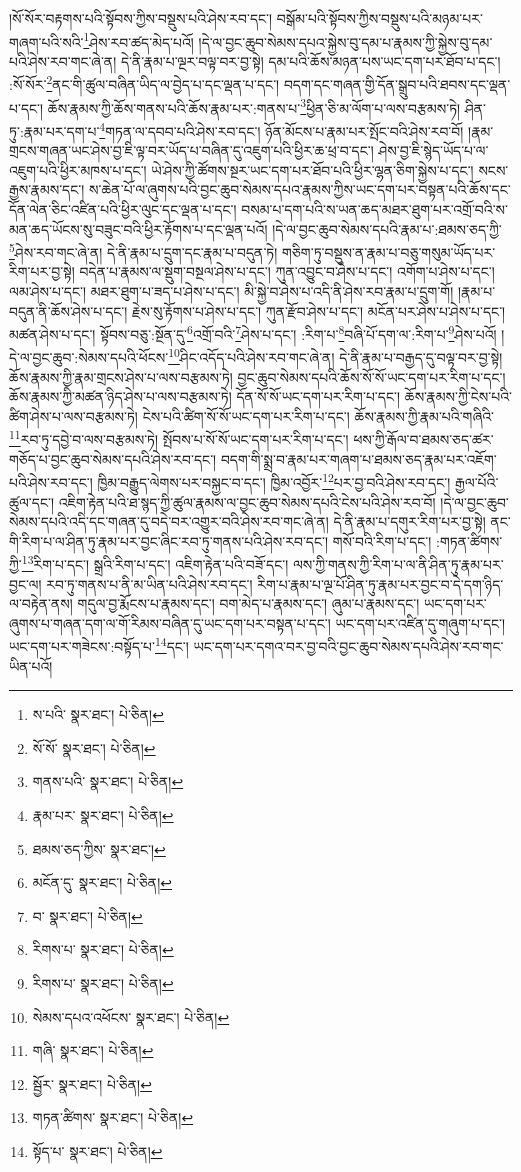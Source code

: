 །སོ་སོར་བརྟགས་པའི་སྟོབས་ཀྱིས་བསྡུས་པའི་ཤེས་རབ་དང་། བསྒོམ་པའི་སྟོབས་ཀྱིས་བསྡུས་པའི་མཉམ་པར་གཞག་པའི་སའི་\footnote{ས་པའི་  སྣར་ཐང་།  པེ་ཅིན། }ཤེས་རབ་ཚད་མེད་པའོ། །དེ་ལ་བྱང་ཆུབ་སེམས་དཔའ་སྐྱེས་བུ་དམ་པ་རྣམས་ཀྱི་སྐྱེས་བུ་དམ་པའི་ཤེས་རབ་གང་ཞེ་ན། དེ་ནི་རྣམ་པ་ལྔར་བལྟ་བར་བྱ་སྟེ། དམ་པའི་ཆོས་མཉན་པས་ཡང་དག་པར་ཐོབ་པ་དང་། :སོ་སོར་\footnote{སོ་སོ་  སྣར་ཐང་།  པེ་ཅིན། }ནང་གི་ཚུལ་བཞིན་ཡིད་ལ་བྱེད་པ་དང་ལྡན་པ་དང་། བདག་དང་གཞན་གྱི་དོན་སྒྲུབ་པའི་ཐབས་དང་ལྡན་པ་དང་། ཆོས་རྣམས་ཀྱི་ཆོས་གནས་པའི་ཆོས་རྣམ་པར་:གནས་པ་\footnote{གནས་པའི་  སྣར་ཐང་།  པེ་ཅིན། }ཕྱིན་ཅི་མ་ལོག་པ་ལས་བརྩམས་ཏེ། ཤིན་ཏུ་:རྣམ་པར་དག་པ་\footnote{རྣམ་པར་  སྣར་ཐང་།  པེ་ཅིན། }གཏན་ལ་དབབ་པའི་ཤེས་རབ་དང་། ཉོན་མོངས་པ་རྣམ་པར་སྤོང་བའི་ཤེས་རབ་བོ། །རྣམ་གྲངས་གཞན་ཡང་ཤེས་བྱ་ཇི་ལྟ་བར་ཡོད་པ་བཞིན་དུ་འཇུག་པའི་ཕྱིར་ཆ་ཕྲ་བ་དང་། ཤེས་བྱ་ཇི་སྙེད་ཡོད་པ་ལ་འཇུག་པའི་ཕྱིར་མཁས་པ་དང་། ཡེ་ཤེས་ཀྱི་ཚོགས་སྔར་ཡང་དག་པར་ཐོབ་པའི་ཕྱིར་ལྷན་ཅིག་སྐྱེས་པ་དང་། སངས་རྒྱས་རྣམས་དང་། ས་ཆེན་པོ་ལ་ཞུགས་པའི་བྱང་ཆུབ་སེམས་དཔའ་རྣམས་ཀྱིས་ཡང་དག་པར་བསྟན་པའི་ཆོས་དང་དོན་ལེན་ཅིང་འཛིན་པའི་ཕྱིར་ལུང་དང་ལྡན་པ་དང་། བསམ་པ་དག་པའི་ས་ཡན་ཆད་མཐར་ཐུག་པར་འགྲོ་བའི་ས་མན་ཆད་ཡོངས་སུ་བཟུང་བའི་ཕྱིར་རྟོགས་པ་དང་ལྡན་པའོ། །དེ་ལ་བྱང་ཆུབ་སེམས་དཔའི་རྣམ་པ་:ཐམས་ཅད་ཀྱི་\footnote{ཐམས་ཅད་ཀྱིས་  སྣར་ཐང་། }ཤེས་རབ་གང་ཞེ་ན། དེ་ནི་རྣམ་པ་དྲུག་དང་རྣམ་པ་བདུན་ཏེ། གཅིག་ཏུ་བསྡུས་ན་རྣམ་པ་བཅུ་གསུམ་ཡོད་པར་རིག་པར་བྱ་སྟེ། བདེན་པ་རྣམས་ལ་སྡུག་བསྔལ་ཤེས་པ་དང་། ཀུན་འབྱུང་བ་ཤེས་པ་དང་། འགོག་པ་ཤེས་པ་དང་། ལམ་ཤེས་པ་དང་། མཐར་ཐུག་པ་ཟད་པ་ཤེས་པ་དང་། མི་སྐྱེ་བ་ཤེས་པ་འདི་ནི་ཤེས་རབ་རྣམ་པ་དྲུག་གོ། །རྣམ་པ་བདུན་ནི་ཆོས་ཤེས་པ་དང་། རྗེས་སུ་རྟོགས་པ་ཤེས་པ་དང་། ཀུན་རྫོབ་ཤེས་པ་དང་། མངོན་པར་ཤེས་པ་ཤེས་པ་དང་། མཚན་ཤེས་པ་དང་། སྟོབས་བཅུ་:སྔོན་དུ་\footnote{མངོན་དུ་  སྣར་ཐང་།  པེ་ཅིན། }འགྲོ་བའི་\footnote{བ་  སྣར་ཐང་།  པེ་ཅིན། }ཤེས་པ་དང་། :རིག་པ་\footnote{རིགས་པ་  སྣར་ཐང་།  པེ་ཅིན། }བཞི་པོ་དག་ལ་:རིག་པ་\footnote{རིགས་པ་  སྣར་ཐང་།  པེ་ཅིན། }ཤེས་པའོ། །དེ་ལ་བྱང་ཆུབ་:སེམས་དཔའི་ཕོངས་\footnote{སེམས་དཔའ་འཕོངས་  སྣར་ཐང་།  པེ་ཅིན། }ཤིང་འདོད་པའི་ཤེས་རབ་གང་ཞེ་ན། དེ་ནི་རྣམ་པ་བརྒྱད་དུ་བལྟ་བར་བྱ་སྟེ། ཆོས་རྣམས་ཀྱི་རྣམ་གྲངས་ཤེས་པ་ལས་བརྩམས་ཏེ། བྱང་ཆུབ་སེམས་དཔའི་ཆོས་སོ་སོ་ཡང་དག་པར་རིག་པ་དང་། ཆོས་རྣམས་ཀྱི་མཚན་ཉིད་ཤེས་པ་ལས་བརྩམས་ཏེ། དོན་སོ་སོ་ཡང་དག་པར་རིག་པ་དང་། ཆོས་རྣམས་ཀྱི་ངེས་པའི་ཚིག་ཤེས་པ་ལས་བརྩམས་ཏེ། ངེས་པའི་ཚིག་སོ་སོ་ཡང་དག་པར་རིག་པ་དང་། ཆོས་རྣམས་ཀྱི་རྣམ་པའི་གཞིའི་\footnote{གཞི་  སྣར་ཐང་།  པེ་ཅིན། }རབ་ཏུ་དབྱེ་བ་ལས་བརྩམས་ཏེ། སྤོབས་པ་སོ་སོ་ཡང་དག་པར་རིག་པ་དང་། ཕས་ཀྱི་རྒོལ་བ་ཐམས་ཅད་ཚར་གཅོད་པ་བྱང་ཆུབ་སེམས་དཔའི་ཤེས་རབ་དང་། བདག་གི་སྨྲ་བ་རྣམ་པར་གཞག་པ་ཐམས་ཅད་རྣམ་པར་འཇོག་པའི་ཤེས་རབ་དང་། ཁྱིམ་བརྒྱུད་ལེགས་པར་བསྐྱང་བ་དང་། ཁྱིམ་འབྱོར་\footnote{སྦྱོར་  སྣར་ཐང་།  པེ་ཅིན། }པར་བྱ་བའི་ཤེས་རབ་དང་། རྒྱལ་པོའི་ཚུལ་དང་། འཇིག་རྟེན་པའི་ཐ་སྙད་ཀྱི་ཚུལ་རྣམས་ལ་བྱང་ཆུབ་སེམས་དཔའི་ངེས་པའི་ཤེས་རབ་བོ། །དེ་ལ་བྱང་ཆུབ་སེམས་དཔའི་འདི་དང་གཞན་དུ་བདེ་བར་འགྱུར་བའི་ཤེས་རབ་གང་ཞེ་ན། དེ་ནི་རྣམ་པ་དགུར་རིག་པར་བྱ་སྟེ། ནང་གི་རིག་པ་ལ་ཤིན་ཏུ་རྣམ་པར་བྱང་ཞིང་རབ་ཏུ་གནས་པའི་ཤེས་རབ་དང་། གསོ་བའི་རིག་པ་དང་། :གཏན་ཚིགས་ཀྱི་\footnote{གཏན་ཚིགས་  སྣར་ཐང་།  པེ་ཅིན། }རིག་པ་དང་། སྒྲའི་རིག་པ་དང་། འཇིག་རྟེན་པའི་བཟོ་དང་། ལས་ཀྱི་གནས་ཀྱི་རིག་པ་ལ་ནི་ཤིན་ཏུ་རྣམ་པར་བྱང་ལ། རབ་ཏུ་གནས་པ་ནི་མ་ཡིན་པའི་ཤེས་རབ་དང་། རིག་པ་རྣམ་པ་ལྔ་པོ་ཤིན་ཏུ་རྣམ་པར་བྱང་བ་དེ་དག་ཉིད་ལ་བརྟེན་ནས། གདུལ་བྱ་རྨོངས་པ་རྣམས་དང་། བག་མེད་པ་རྣམས་དང་། ཞུམ་པ་རྣམས་དང་། ཡང་དག་པར་ཞུགས་པ་གཞན་དག་ལ་གོ་རིམས་བཞིན་དུ་ཡང་དག་པར་བསྟན་པ་དང་། ཡང་དག་པར་འཛིན་དུ་གཞུག་པ་དང་། ཡང་དག་པར་གཟེངས་:བསྟོད་པ་\footnote{སྟོད་པ་  སྣར་ཐང་།  པེ་ཅིན། }དང་། ཡང་དག་པར་དགའ་བར་བྱ་བའི་བྱང་ཆུབ་སེམས་དཔའི་ཤེས་རབ་གང་ཡིན་པའོ། 